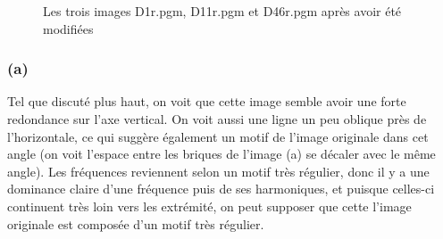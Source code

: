 \documentclass[12pt]{article}
\begin{document}
\begin{figure}[ht]
  \centering
  \hspace{0.5cm}
  \hspace{0.5cm}
  \captionsetup{width=.8\linewidth}
  \caption{Les trois images D1r.pgm, D11r.pgm et D46r.pgm après avoir été modifiées}
\end{figure}

\subsubsection{(a)}
\begin{figure}
  \centering
  \caption{}
\end{figure}
Tel que discuté plus haut, on voit que cette image semble avoir une forte redondance sur l'axe vertical. On voit aussi une ligne un peu oblique près de l'horizontale, ce qui suggère également un motif de l'image originale dans cet angle (on voit l'espace entre les briques de l'image (a) se décaler avec le même angle). Les fréquences reviennent selon un motif très régulier, donc il y a une dominance claire d'une fréquence puis de ses harmoniques, et puisque celles-ci continuent très loin vers les extrémité, on peut supposer que cette l'image originale est composée d'un motif très régulier.
\end{document}
